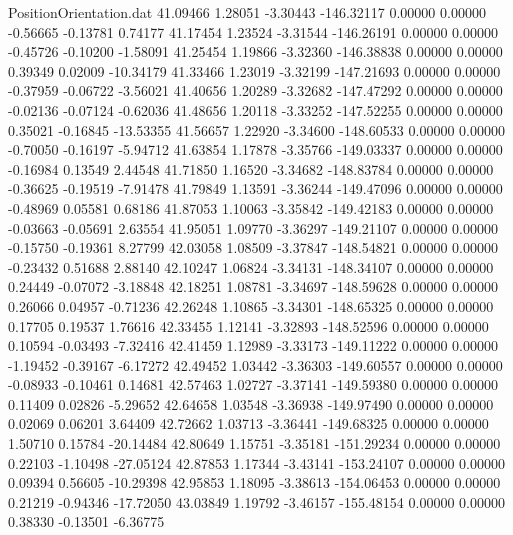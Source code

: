 \begin{filecontents}{PositionOrientation.dat}
  41.09466    1.28051   -3.30443  -146.32117    0.00000    0.00000   -0.56665   -0.13781    0.74177
  41.17454    1.23524   -3.31544  -146.26191    0.00000    0.00000   -0.45726   -0.10200   -1.58091
  41.25454    1.19866   -3.32360  -146.38838    0.00000    0.00000    0.39349    0.02009  -10.34179
  41.33466    1.23019   -3.32199  -147.21693    0.00000    0.00000   -0.37959   -0.06722   -3.56021
  41.40656    1.20289   -3.32682  -147.47292    0.00000    0.00000   -0.02136   -0.07124   -0.62036
  41.48656    1.20118   -3.33252  -147.52255    0.00000    0.00000    0.35021   -0.16845  -13.53355
  41.56657    1.22920   -3.34600  -148.60533    0.00000    0.00000   -0.70050   -0.16197   -5.94712
  41.63854    1.17878   -3.35766  -149.03337    0.00000    0.00000   -0.16984    0.13549    2.44548
  41.71850    1.16520   -3.34682  -148.83784    0.00000    0.00000   -0.36625   -0.19519   -7.91478
  41.79849    1.13591   -3.36244  -149.47096    0.00000    0.00000   -0.48969    0.05581    0.68186
  41.87053    1.10063   -3.35842  -149.42183    0.00000    0.00000   -0.03663   -0.05691    2.63554
  41.95051    1.09770   -3.36297  -149.21107    0.00000    0.00000   -0.15750   -0.19361    8.27799
  42.03058    1.08509   -3.37847  -148.54821    0.00000    0.00000   -0.23432    0.51688    2.88140
  42.10247    1.06824   -3.34131  -148.34107    0.00000    0.00000    0.24449   -0.07072   -3.18848
  42.18251    1.08781   -3.34697  -148.59628    0.00000    0.00000    0.26066    0.04957   -0.71236
  42.26248    1.10865   -3.34301  -148.65325    0.00000    0.00000    0.17705    0.19537    1.76616
  42.33455    1.12141   -3.32893  -148.52596    0.00000    0.00000    0.10594   -0.03493   -7.32416
  42.41459    1.12989   -3.33173  -149.11222    0.00000    0.00000   -1.19452   -0.39167   -6.17272
  42.49452    1.03442   -3.36303  -149.60557    0.00000    0.00000   -0.08933   -0.10461    0.14681
  42.57463    1.02727   -3.37141  -149.59380    0.00000    0.00000    0.11409    0.02826   -5.29652
  42.64658    1.03548   -3.36938  -149.97490    0.00000    0.00000    0.02069    0.06201    3.64409
  42.72662    1.03713   -3.36441  -149.68325    0.00000    0.00000    1.50710    0.15784  -20.14484
  42.80649    1.15751   -3.35181  -151.29234    0.00000    0.00000    0.22103   -1.10498  -27.05124
  42.87853    1.17344   -3.43141  -153.24107    0.00000    0.00000    0.09394    0.56605  -10.29398
  42.95853    1.18095   -3.38613  -154.06453    0.00000    0.00000    0.21219   -0.94346  -17.72050
  43.03849    1.19792   -3.46157  -155.48154    0.00000    0.00000    0.38330   -0.13501   -6.36775

\end{filecontents}
